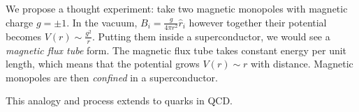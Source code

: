 We propose a thought experiment: take two magnetic monopoles with magnetic charge $g = \pm 1$. In the vacuum, $B_i = \frac{g}{4\pi r^2} \hat{r}_i$ however together their potential becomes $V\left( r \right) \sim \frac{g^2}{r}$. Putting them inside a superconductor, we would see a \emph{magnetic flux tube} form. The magnetic flux tube takes constant energy per unit length, which means that the potential grows $V\left( r \right) \sim  r$ with distance. Magnetic monopoles are then \emph{confined} in a superconductor.

This analogy and process extends to quarks in QCD.
